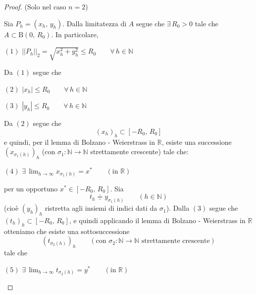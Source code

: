 \begin{proof} (Solo nel caso $n=2$)\\

\begin{center}
\def\svgwidth{8cm}

\end{center}

Sia $P_h = (x_h,\,y_h)$. Dalla limitatezza di $A$ segue che $\exists \, R_0 > 0$ tale che $A \subset \mathrm{B}(0,\,R_0)$. In particolare,
\begin{center}
$\mathrm{(1)}$
\hfill
$\displaystyle
||P_h||_2 = \sqrt{x_h^2 + y_h^2} \leq R_0 \qquad \forall \, h \in \mathbb{N}
$
\hfill \null \\
\end{center}
Da $\mathrm{(1)}$ segue che
\begin{center}
$\mathrm{(2)}$
\hfill
$\displaystyle
|x_h| \leq R_0 \qquad \forall \, h \in \mathbb{N}
$
\hfill \null \\
\end{center}
\begin{center}
$\mathrm{(3)}$
\hfill
$\displaystyle
|y_h| \leq R_0 \qquad \forall \, h \in \mathbb{N}
$
\hfill \null \\
\end{center}
Da $\mathrm{(2)}$ segue che
$$
(x_h)_h \subset [-R_0,\,R_0]
$$
e quindi, per il lemma di Bolzano - Weierstrass in $\mathbb{R}$, esiste una successione $(x_{\sigma_1(h)})_h$ (con $\sigma_1 : \mathbb{N} \longrightarrow \mathbb{N}$ strettamente crescente) tale che:
\begin{center}
$\mathrm{(4)}$
\hfill
$\displaystyle
\exists \, \lim_{h \rightarrow \infty} x_{\sigma_1(h)} = x^* \qquad (\text{in } \mathbb{R})
$
\hfill \null \\
\end{center}
per un opportuno $x^* \in [-R_0,\,R_0]$. Sia
$$
t_h \doteqdot y_{\sigma_1(h)} \qquad (h \in \mathbb{N})
$$
(cioè $(y_h)_h$ ristretta agli insiemi di indici dati da $\sigma_1$). Dalla $\mathrm{(3)}$ segue che $(t_h)_h \subset [-R_0,\,R_0]$, e quindi applicando il lemma di Bolzano - Weierstrass in $\mathbb{R}$ otteniamo che esiste una sottosuccessione
$$
(t_{\sigma_2(h)})_h \qquad (\text{con } \sigma_2 : \mathbb{N} \longrightarrow \mathbb{N} \text{ strettamente crescente})
$$
tale che
\begin{center}
$\mathrm{(5)}$
\hfill
$\displaystyle
\exists \, \lim_{h \rightarrow \infty} t_{\sigma_2(h)} = y^* \qquad (\text{in } \mathbb{R})
$
\hfill \null \\

\end{center}
\end{proof}
